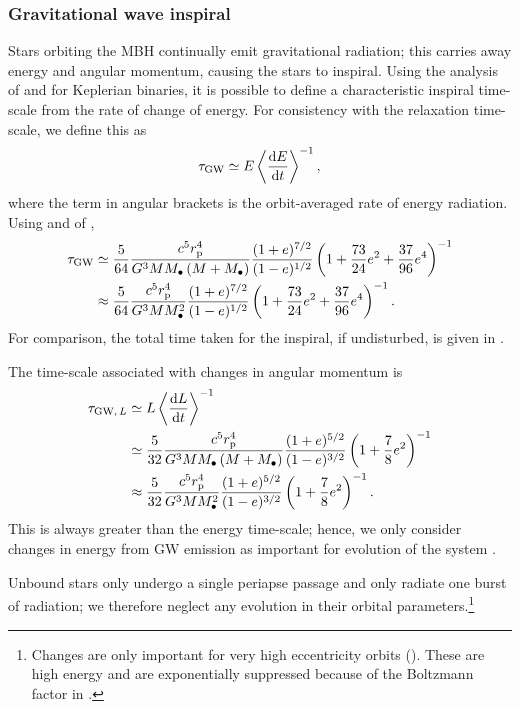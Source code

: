 \subsubsection{Gravitational wave inspiral}\label{sec:GW-in}

Stars orbiting the MBH continually emit gravitational radiation; this carries away energy and angular momentum, causing the stars to inspiral. Using the analysis of \citet{Peters1963} and \citet{Peters1964} for Keplerian binaries, it is possible to define a characteristic inspiral time-scale from the rate of change of energy. For consistency with the relaxation time-scale, we define this as \citep{MiraldaEscude2000, Merritt2011}
\begin{equation}
\tau_\mathrm{GW} \simeq E\left\langle\dfrac{\mathrm{d} {E}}{\mathrm{d} {t}}\right\rangle^{-1},
\label{eq:tGW-def}
\end{equation}
where the term in angular brackets is the orbit-averaged rate of energy radiation. Using  and of \citet[equation 16]{Peters1963},
\begin{align}
\tau_\mathrm{GW} \simeq {} & \dfrac{5}{64}\dfrac{c^5r_\mathrm{p}^4}{G^3MM_\bullet\left(M + M_\bullet\right)}\dfrac{(1+e)^{7/2}}{(1-e)^{1/2}}\left(1+\dfrac{73}{24}e^2 + \dfrac{37}{96}e^4\right)^{-1} \\
 \approx {} & \dfrac{5}{64}\dfrac{c^5r_\mathrm{p}^4}{G^3MM_\bullet^2}\dfrac{(1+e)^{7/2}}{(1-e)^{1/2}}\left(1+\dfrac{73}{24}e^2 + \dfrac{37}{96}e^4\right)^{-1}.
\end{align}
For comparison, the total time taken for the inspiral, if undisturbed, is given in .

The time-scale associated with changes in angular momentum is \citep{Peters1964}
\begin{align}
\tau_{\mathrm{GW},\, L} \simeq {} & L\left\langle\dfrac{\mathrm{d} {L}}{\mathrm{d} {t}}\right\rangle^{-1} \\
 \simeq {} & \dfrac{5}{32}\dfrac{c^5r_\mathrm{p}^4}{G^3MM_\bullet\left(M + M_\bullet\right)}\dfrac{(1+e)^{5/2}}{(1-e)^{3/2}}\left(1+\dfrac{7}{8}e^2\right)^{-1} \\
 \approx {} & \dfrac{5}{32}\dfrac{c^5r_\mathrm{p}^4}{G^3MM_\bullet^2}\dfrac{(1+e)^{5/2}}{(1-e)^{3/2}}\left(1+\dfrac{7}{8}e^2\right)^{-1}.
\end{align}
This is always greater than the energy time-scale; hence, we only consider changes in energy from GW emission as important for evolution of the system \citep{Hopman2005}.

Unbound stars only undergo a single periapse passage and only radiate one burst of radiation; we therefore neglect any evolution in their orbital parameters.\footnote{Changes are only important for very high eccentricity orbits (). These are high energy and are exponentially suppressed because of the Boltzmann factor in .}

